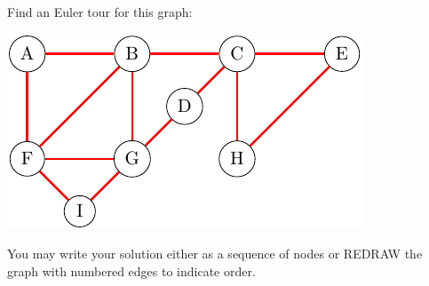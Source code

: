 \documentclass[addpoints,12pt]{exam}
\begin{document}
\begin{questions}

  \newpage
  \question[30] Find an Euler tour for this graph:
  \begin{center}
    \includegraphics{euler.pdf}
  \end{center}
  You may write your solution either as a sequence of nodes or REDRAW the graph with numbered edges to indicate order.
  \vspace*{10cm}
  \begin{solution}
  \end{solution}
\end{questions}
\end{document}
